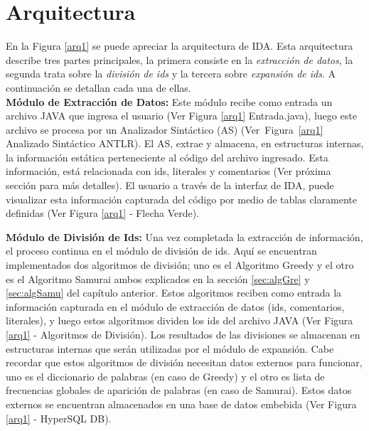 \section{Arquitectura}


En la Figura \ref{arq1} se puede apreciar la arquitectura de IDA. Esta arquitectura describe tres partes principales, la primera consiste en la \textit{extracción de datos}, la segunda trata sobre la \textit{división de ids} y la tercera sobre \textit{expansión de ids}. A continuación se detallan cada una de ellas.\\

\textbf{Módulo de Extracción de Datos:} Este módulo recibe como entrada un archivo JAVA que ingresa el usuario (Ver Figura \ref{arq1} Entrada.java), luego este archivo se procesa por un Analizador Sintáctico (AS) (\mbox{Ver Figura \ref{arq1}} Analizado Sintáctico ANTLR). El AS, extrae y almacena, en estructuras internas, la información estática perteneciente al código del archivo ingresado. Esta información, está relacionada con ids, literales y comentarios (Ver próxima sección para más detalles). El usuario a través de la interfaz de IDA, puede visualizar esta información capturada del código por medio de tablas claramente definidas (Ver Figura \ref{arq1} - Flecha Verde).

\textbf{Módulo de División de Ids:} Una vez completada la extracción de información, el proceso continua en el módulo de división de ids. Aquí se encuentran implementados dos algoritmos de división; uno es el Algoritmo Greedy y el otro es el Algoritmo Samurai ambos explicados en la sección \ref{sec:algGre} y \ref{sec:algSamu} del capítulo anterior. Estos algoritmos reciben como entrada la información capturada en el módulo de extracción de datos (ids, comentarios, literales), y luego estos algoritmos dividen los ids del archivo JAVA (Ver Figura \ref{arq1} - Algoritmos de División). Los resultados de las divisiones se almacenan en estructuras internas que serán utilizadas por el módulo de expansión. Cabe recordar que estos algoritmos de división necesitan datos externos para funcionar, uno es el diccionario de palabras (en caso de Greedy) y el otro es lista de frecuencias globales de aparición de palabras (en caso de Samurai). Estos datos externos se encuentran almacenados en una base de datos embebida (Ver Figura \ref{arq1} - HyperSQL DB).

